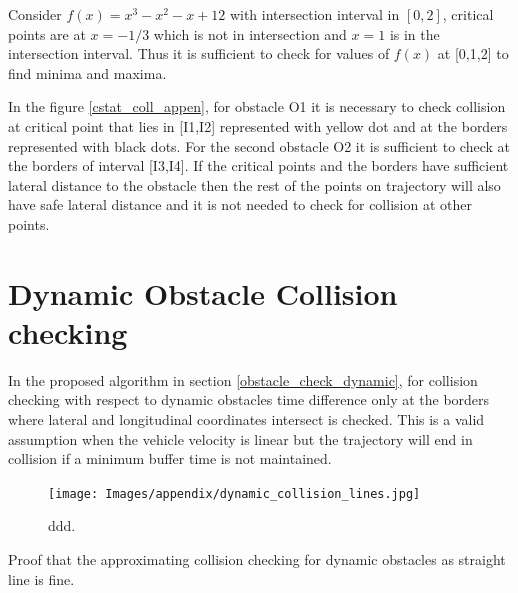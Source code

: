 Consider $f(x) = x^3 - x^2 -x + 12$ with intersection interval in $[0,2]$, critical points are at $x=-1/3$ which is not in intersection and $x=1$ is in the intersection interval. Thus it is sufficient to check for values of $f(x)$ at [0,1,2] to find minima and maxima. 

In the figure \ref{cstat_coll_appen}, for obstacle O1 it is necessary to check collision at critical point that lies in [I1,I2] represented with yellow dot and at the borders represented with black dots. For the second obstacle O2 it is sufficient to check at the borders of interval [I3,I4]. If the critical points and the borders have sufficient lateral distance to the obstacle then the rest of the points on trajectory will also have safe lateral distance and it is not needed to check for collision at other points. 


\section{Dynamic Obstacle Collision checking}
\label{dynamic_obst_appendix}

In the proposed algorithm in section \ref{obstacle_check_dynamic}, for collision checking with respect to dynamic obstacles time difference only at the borders where lateral and longitudinal coordinates intersect is checked. This is a valid assumption when the vehicle velocity is linear but the trajectory will end in collision if a minimum buffer time is not maintained. 

\begin{figure}
	\centering
	\texttt{[image: Images/appendix/dynamic\_collision\_lines.jpg]}
	\caption{ddd.}
	\label{dynamic_appendix}
\end{figure}




Proof that the approximating collision checking for dynamic obstacles as straight line is fine. 

